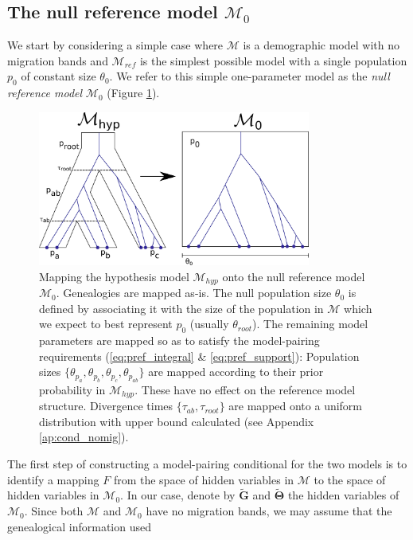 \documentclass[11pt]{article}
\newcommand{\vect}[1]{\boldsymbol{\mathbf{#1}}}
\newcommand{\M}{\mathcal{M}}
\newcommand{\G}{\vect{G}}
\newcommand{\T}{\vect{\Theta}}
\newcommand{\Mref}{\M_{ref}}
\newcommand{\Gref}{\widetilde{\G}}
\newcommand{\Tref}{\widetilde{\T}}
\newcommand{\1}{\mathbbm{1}}
\begin{document}
\subsection{The null reference model $\M_0$}
\label{The null reference model}
We start by considering a simple case where $\M$ is a demographic model with no migration bands and $\Mref$ is the simplest possible model with a single population $p_0$ of constant size $\theta_0$.
%
We refer to this simple one-parameter model as the {\em null reference model} $\M_0$ (Figure \ref{fig:null_reference_model_no_migration}).
%
\begin{figure}[h]
\centering
\includegraphics[width=0.8\textwidth]
{null_reference_model_no_migration}
\captionsetup{width=.8\textwidth}
\caption{Mapping the hypothesis model $\M_{hyp}$ onto the null reference model $\M_0$. Genealogies are mapped as-is. The null population size $\theta_0$ is defined by associating it with the size of the population in $\M$ which we expect to best represent $p_0$ (usually $\theta_{root}$). The remaining model parameters are mapped so as to satisfy the model-pairing requirements (\ref{eq:pref_integral} \& \ref{eq:pref_support}):
Population sizes $\{\theta_{p_a}, \theta_{p_b}, \theta_{p_c}, \theta_{p_{ab}}\}$ are mapped according to their prior probability in $\M_{hyp}$. These have no effect on the reference model structure. Divergence times $\{\tau_{ab}, \tau_{root}\}$ are mapped onto a uniform distribution with upper bound calculated (see Appendix \ref{ap:cond_nomig}).}
\label{fig:null_reference_model_no_migration}
\end{figure}
%
The first step of constructing a model-pairing conditional for the two models is to identify a mapping $F$ from the space
of hidden variables in $\M$ to the space of hidden variables in $\M_0$.
%
In our case, denote by $\Gref$ and $\Tref$ the hidden variables of $\M_0$.
%
Since both $\M$ and $\M_0$ have no migration bands, we may assume that the genealogical information used
\end{document}
